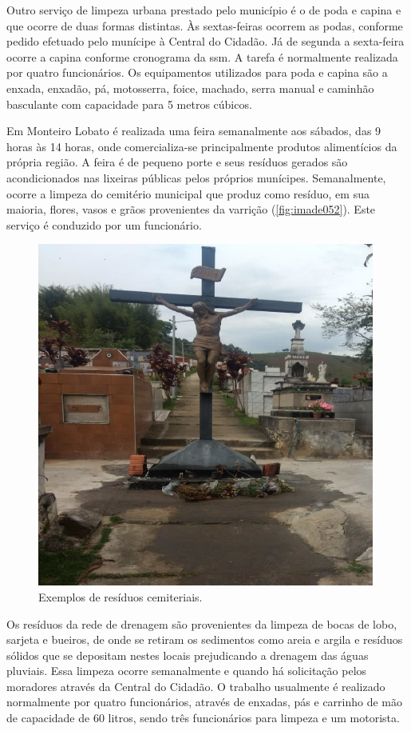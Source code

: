 	Outro serviço de limpeza urbana prestado pelo município é o de poda e capina e que ocorre de duas formas distintas. Às sextas-feiras ocorrem as podas, conforme pedido efetuado pelo munícipe à Central do Cidadão. Já de segunda a sexta-feira ocorre a capina conforme cronograma da \gls{ssm}. A tarefa é normalmente realizada por quatro funcionários. Os equipamentos utilizados para poda e capina são a enxada, enxadão, pá, motosserra, foice, machado, serra manual e caminhão basculante com capacidade para 5 metros cúbicos.

	Em Monteiro Lobato é realizada uma feira semanalmente aos sábados, das 9 horas às 14 horas, onde comercializa-se principalmente produtos alimentícios da própria região. A feira é de pequeno porte e seus resíduos gerados são acondicionados nas lixeiras públicas pelos próprios munícipes. Semanalmente, ocorre a limpeza do cemitério municipal que produz como resíduo, em sua maioria, flores, vasos e grãos provenientes da varrição (\autoref{fig:imade052}). Este serviço é conduzido por um funcionário.
	
	\begin{figure}
		\centering
		\includegraphics[width=0.5\linewidth]{produtos/prodtres/image052}
		\caption{Exemplos de resíduos cemiteriais.}
		\label{fig:image052}
	\end{figure}

	
	Os resíduos da rede de drenagem são provenientes da limpeza de bocas de lobo, sarjeta e bueiros, de onde se retiram os sedimentos como areia e argila e resíduos sólidos que se depositam nestes locais prejudicando a drenagem das águas pluviais. Essa limpeza ocorre semanalmente e quando há solicitação pelos moradores através da Central do Cidadão. O trabalho usualmente é realizado normalmente por quatro funcionários, através de enxadas, pás e carrinho de mão de capacidade de 60 litros, sendo três funcionários para limpeza e um motorista.
	
